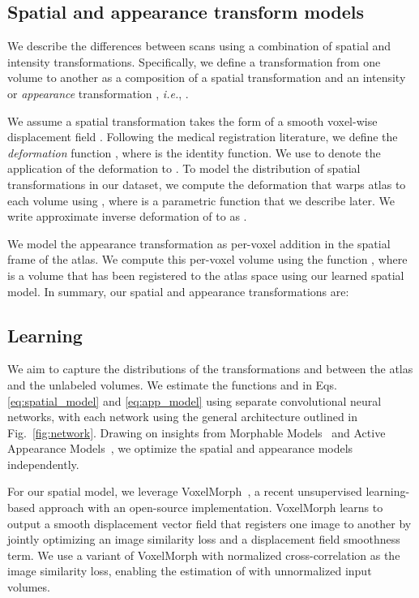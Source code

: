 \documentclass[10pt,twocolumn,letterpaper]{article}
\begin{document}
\subsection{Spatial and appearance transform models}\label{sec:transform_models}
We describe the differences between scans using a combination of spatial and intensity transformations. Specifically, we define a transformation  from one volume to another as a composition of a spatial transformation  and an intensity or \textit{appearance} transformation , \textit{i.e.}, . 




We assume a spatial transformation takes the form of a smooth voxel-wise displacement field . Following the medical registration literature, we define the \textit{deformation} function , where  is the identity function. We use  to denote the application of the deformation  to . To model the distribution of spatial transformations in our dataset, we compute the deformation that warps atlas  to each volume  using , where  is a parametric function that we describe later.  We write approximate inverse deformation of  to  as . 

We model the appearance transformation  as per-voxel addition in the spatial frame of the atlas. We compute this per-voxel volume using the function \mbox{}, where  is a volume that has been registered to the atlas space using our learned spatial model. 
In summary, our spatial and appearance transformations are:
\vspace{-1pt}







\subsection{Learning}
We aim to capture the distributions of the transformations  and  between the atlas and the unlabeled volumes. We estimate the functions  and  in Eqs. \eqref{eq:spatial_model} and \eqref{eq:app_model} using separate convolutional neural networks, with each network using the general architecture outlined in Fig.~\ref{fig:network}. Drawing on insights from Morphable Models~\cite{jones1998multidimensional} and Active Appearance Models~\cite{cootes2001active,cootes2001statistical}, we optimize the spatial and appearance models independently. 


For our spatial model, we leverage VoxelMorph~\cite{balakrishnan2018unsupervised,balakrishnan2019voxelmorph,dalca2018unsupervised}, a recent unsupervised learning-based approach with an open-source implementation. VoxelMorph learns to output a smooth displacement vector field that registers one image to another by jointly optimizing an image similarity loss and a displacement field smoothness term. We use a variant of VoxelMorph with normalized cross-correlation as the image similarity loss, enabling the estimation of  with unnormalized input volumes. 
\end{document}
